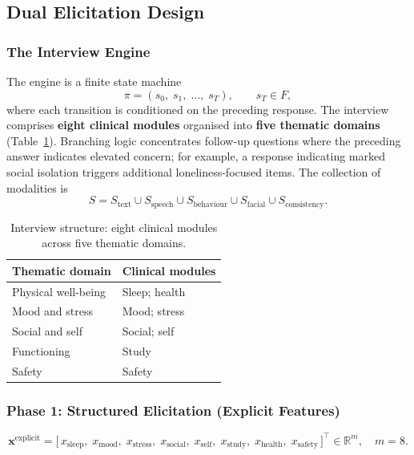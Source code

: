\documentclass[12pt]{article}
\begin{document}
\subsection{Dual Elicitation Design}

\subsubsection{The Interview Engine}

The engine is a finite state machine
\begin{equation}
\pi = (s_0,\; s_1,\; \ldots,\; s_T), \qquad s_T \in F,
\end{equation}
where each transition is conditioned on the preceding response. The
interview comprises \textbf{eight clinical modules} organised into
\textbf{five thematic domains} (Table~\ref{tab:modules}). Branching
logic concentrates follow-up questions where the preceding answer
indicates elevated concern; for example, a response indicating marked
social isolation triggers additional loneliness-focused items. The
collection of modalities is
\begin{equation}
S = S_{\text{text}} \cup S_{\text{speech}} \cup S_{\text{behaviour}}
    \cup S_{\text{facial}} \cup S_{\text{consistency}}.
\end{equation}

\begin{table}[H]
\centering
\caption{Interview structure: eight clinical modules across five
thematic domains.}
\label{tab:modules}
\begin{tabular}{@{}ll@{}}
\toprule
Thematic domain & Clinical modules \\
\midrule
Physical well-being & Sleep; health \\
Mood and stress     & Mood; stress \\
Social and self     & Social; self \\
Functioning         & Study \\
Safety              & Safety \\
\bottomrule
\end{tabular}
\end{table}

\subsubsection{Phase 1: Structured Elicitation (Explicit Features)}

\begin{equation}
\mathbf{x}^{\text{explicit}} = \bigl[\, x_{\text{sleep}},\; x_{\text{mood}},\;
x_{\text{stress}},\; x_{\text{social}},\; x_{\text{self}},\;
x_{\text{study}},\; x_{\text{health}},\; x_{\text{safety}} \,\bigr]^{\top}
\in \mathbb{R}^{m}, \quad m = 8.
\end{equation}
\end{document}
